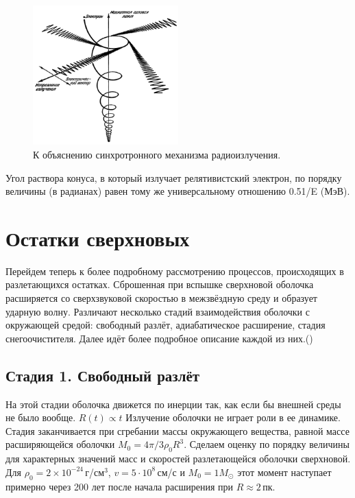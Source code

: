 \documentclass[a4paper,12pt]{extarticle}
\begin{document}
\begin{figure}[!htb]
	\centering
	\includegraphics[width=0.5\textwidth]{synchrotron_radiation.png}
	\caption{
		К объяснению синхротронного механизма радиоизлучения.
	}
	\label{fig:synchrotron_radiation}
\end{figure}
Угол раствора конуса, в который излучает релятивистский электрон, по порядку величины (в радианах) равен тому же универсальному отношению 0.51/E (МэВ).

\section{Остатки сверхновых} \label{sec: Supernova remnants}
Перейдем теперь к более подробному рассмотрению процессов, происходящих в разлетающихся остатках.
Сброшенная при вспышке сверхновой оболочка расширяется со сверхзвуковой скоростью в межзвёздную среду и образует ударную волну. 
Различают несколько стадий взаимодействия оболочки с окружающей средой: свободный разлёт, адиабатическое расширение, стадия 
снегоочистителя. Далее идёт более подробное описание каждой из них.({\cite{Spitzer1981}}) 

\subsection{Стадия 1. Свободный разлёт} \label{sec:free_exp}
На этой стадии оболочка движется по инерции так, как если бы внешней среды не было вообще.
 $R(t)\propto t $ 
Излучение оболочки не играет роли в ее динамике. 
Стадия заканчивается при сгребании массы окружающего вещества, равной массе расширяющейся оболочки $M_0 = 4\pi/3\rho_0R^3$. 
Сделаем оценку по порядку величины для характерных значений масс и скоростей разлетающейся оболочки сверхновой.
Для $\rho_0=2\times10^{-24}$\,г/см$^3$, $v=5\cdot10^8$\,см/с и $M_0=1M_{\odot}$ этот момент наступает примерно через 200 лет после начала расширения при $R\approx 2$\,пк. 
\end{document}
